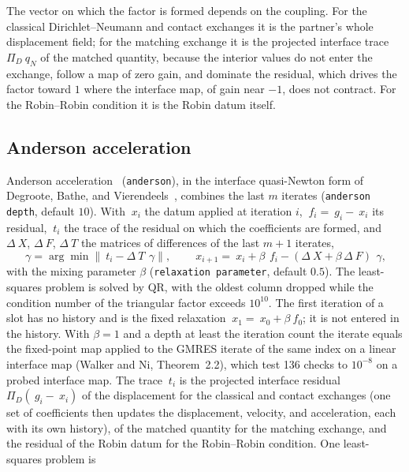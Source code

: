 \documentclass[11pt]{article}
\newcommand{\norm}[1]{\lVert #1 \rVert}
\newcommand{\code}[1]{\texttt{#1}}
\begin{document}
The vector on which the factor is formed depends on the coupling. For the
classical Dirichlet--Neumann and contact exchanges it is the partner's
whole displacement field; for the matching exchange it is the projected
interface trace $\Pi_D ~q_N$ of the matched quantity, because the interior
values do not enter the exchange, follow a map of zero gain, and dominate
the residual, which drives the factor toward $1$ where the interface map,
of gain near $-1$, does not contract. For the Robin--Robin condition it is
the Robin datum itself.

\subsection{Anderson acceleration}
\label{sec:anderson}

Anderson acceleration~\cite{WalkerNi2011} (\code{anderson}), in the
interface quasi-Newton form of Degroote, Bathe, and
Vierendeels~\cite{DegrooteBatheVierendeels2009}, combines the last $m$
iterates (\code{anderson depth}, default $10$). With $~x_i$ the datum
applied at iteration $i$, $~f_i = ~g_i - ~x_i$ its residual, $~t_i$ the
trace of the residual on which the coefficients are formed, and
$\Delta ~X$, $\Delta ~F$, $\Delta ~T$ the matrices of differences of the
last $m + 1$ iterates,
\begin{equation}
  ~\gamma = \arg\min \norm{~t_i - \Delta ~T\, ~\gamma}, \qquad
  ~x_{i+1} = ~x_i + \beta\, ~f_i - (\Delta ~X + \beta\, \Delta ~F)\, ~\gamma ,
  \label{eq:anderson}
\end{equation}
with the mixing parameter $\beta$ (\code{relaxation parameter}, default
$0.5$). The least-squares problem is solved by QR, with the oldest column
dropped while the condition number of the triangular factor exceeds
$10^{10}$. The first iteration of a slot has no history and is the fixed
relaxation $~x_1 = ~x_0 + \beta ~f_0$; it is not entered in the history.
With $\beta = 1$ and a depth at least the iteration count the iterate
equals the fixed-point map applied to the GMRES iterate of the same index
on a linear interface map (Walker and Ni, Theorem~2.2), which test 136
checks to $10^{-8}$ on a probed interface map. The trace $~t_i$ is the
projected interface residual $\Pi_D(~g_i - ~x_i)$ of the displacement for
the classical and contact exchanges (one set of coefficients then updates
the displacement, velocity, and acceleration, each with its own history),
of the matched quantity for the matching exchange, and the residual of the
Robin datum for the Robin--Robin condition. One least-squares problem is
\end{document}
